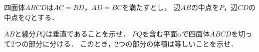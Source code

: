 \documentclass[../../main.tex]{subfiles}
\begin{document}
四面体$ABCD$は$AC=BD$，$AD=BC$を満たすとし，
辺$AB$の中点を$P$，辺$CD$の中点を$Q$とする．
\begin{enumerate}
  $AB$と線分$PQ$は垂直であることを示せ．
  $PQ$を含む平面$\alpha$で四面体$ABCD$を切って2つの部分に分ける．
    このとき，2つの部分の体積は等しいことを示せ．
\end{enumerate}
\end{document}
